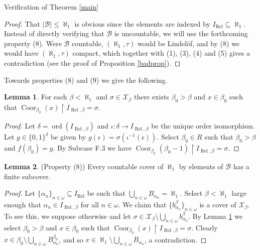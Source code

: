 \documentclass{amsart}
\theoremstyle{definition}\newtheorem{theorem}{Theorem}
\theoremstyle{definition}\newtheorem{bigtheorem}{Theorem}
\numberwithin{theorem}{section}
\theoremstyle{definition}\newtheorem{corollary}[theorem]{Corollary}
\theoremstyle{definition}\newtheorem{proposition}[theorem]{Proposition}
\theoremstyle{definition}\newtheorem{definition}[theorem]{Definition}
\theoremstyle{definition}\newtheorem{question}[theorem]{Question}
\theoremstyle{definition}\newtheorem{example}[theorem]{Example}
\theoremstyle{definition}\newtheorem{remark}[theorem]{Remark}
\theoremstyle{definition}\newtheorem{note}[theorem]{Note}
\theoremstyle{definition}\newtheorem{lemma}[theorem]{Lemma}
\theoremstyle{definition}\newtheorem{fact}[theorem]{Fact}
\theoremstyle{definition}\newtheorem{define}[theorem]{Definition}
\theoremstyle{definition}\newtheorem{definitions}[theorem]{Definitions}
\theoremstyle{definition}\newtheorem{claim}[theorem]{Claim}
\theoremstyle{definition}\newtheorem{obs}[theorem]{Observation}
\theoremstyle{definition}\newtheorem{construction}[theorem]{Construction}
\newcommand{\Rel}{\operatorname{Rel}}
\newcommand{\X}{\mathcal{X}}
\newcommand{\Coor}{\operatorname{Coor}}
\newcommand{\Bo}{\mathcal{B}}
\newcommand{\ord}{\operatorname{ord}}
\begin{document}
\begin{section}{Verification of Theorem \ref{main}}
\begin{proof}  That $|\Bo| \leq \aleph_1$ is obvious since the elements are indexed by $I_{\Rel} \subseteq \aleph_1$.  Instead of directly verifying that $\Bo$ is uncountable, we will use the forthcoming property (8).  Were $\Bo$ countable, $(\aleph_1, \tau)$ would be Lindel\"of, and by (8) we would have $(\aleph_1, \tau)$ compact, which together with (1), (3), (4) and (5) gives a contradiction (see the proof of Proposition \ref{badprop}).
\end{proof}

Towards properties (8) and (9) we give the following.

\begin{lemma} \label{thickness}  For each $\beta < \aleph_1$ and $\sigma \in \X_{\beta}$ there exists $\beta_0 > \beta$ and $x \in \beta_0$ such that $\Coor_{\beta_0}(x) \upharpoonright I_{\Rel, \beta} = \sigma$.
\end{lemma}

\begin{proof}  Let $\delta = \ord(I_{\Rel, \beta})$ and $\iota: \delta \rightarrow I_{\Rel, \beta}$ be the unique order isomorphism.  Let $g \in \{0, 1\}^{\delta}$ be given by $g(\epsilon) = \sigma(\iota^{-1}(\epsilon))$.  Select $\beta_0 \in R$ such that $\beta_0 > \beta$ and $f(\beta_0) = g$.  By Subcase F.3 we have $\Coor_{\beta_0}(\beta_0 - 1) \upharpoonright I_{\Rel, \beta} = \sigma$.
\end{proof}

\begin{lemma}\label{nicecoverindeed}(Property (8))  Every countable cover of $\aleph_1$ by elements of $\Bo$ has a finite subcover.
\end{lemma}

\begin{proof}  Let $\{\alpha_n\}_{n\in \omega} \subseteq I_{\Rel}$ be such that $\bigcup_{n\in \omega} B_{\alpha_n} = \aleph_1$.  Select $\beta < \aleph_1$ large enough that $\alpha_n \in I_{\Rel, \beta}$ for all $n \in \omega$.  We claim that $\{b_{\alpha_n}^{\beta}\}_{n\in \omega}$ is a cover of $\X_{\beta}$.  To see this, we suppose otherwise and let $\sigma \in \X_{\beta} \setminus \bigcup_{n\in \omega} b_{\alpha_n}^{\beta}$.  By Lemma \ref{thickness} we select $\beta_0 > \beta$ and $x\in \beta_0$ such that $\Coor_{\beta_0}(x) \upharpoonright I_{\Rel, \beta} = \sigma$.  Clearly $x\in \beta_0 \setminus \bigcup_{n\in \omega} B_{\alpha_n}^{\beta_0}$, and so $x\in \aleph_1 \setminus \bigcup_{n\in \omega} B_{\alpha_n}$, a contradiction.


\end{proof}
\end{section}
\end{document}
